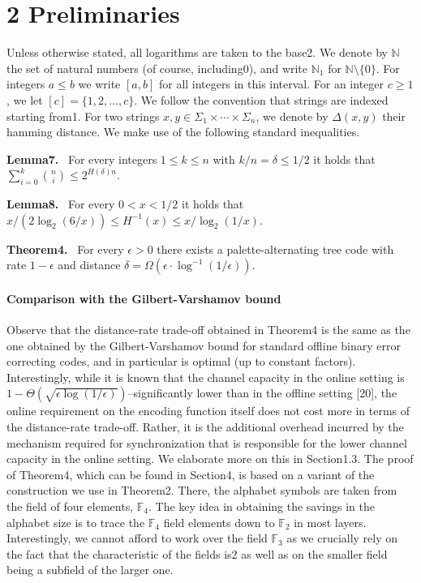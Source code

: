 \documentclass[10pt,a4paper]{article}
\newenvironment{authorclaim}[1]{\par\medskip\noindent\textbf{#1.}\ \ignorespaces}{\par\medskip}
\begin{document}
\section*{2 Preliminaries}
Unless otherwise stated, all logarithms are taken to the base2. We denote by $\mathbb N$ the set of natural numbers (of course, including0), and write $\mathbb N_1$ for $\mathbb N\setminus\{0\}$. For integers $a\le b$ we write $[a,b]$ for all integers in this interval. For an integer $c\ge1$, we let $[c]=\{1,2,\ldots,c\}$. We follow the convention that strings are indexed starting from1. For two strings $x,y\in\Sigma_1\times\cdots\times\Sigma_n$, we denote by $\Delta(x,y)$ their hamming distance. We make use of the following standard inequalities.
\begin{authorclaim}{Lemma7}
For every integers $1\le k\le n$ with $k/n=\delta\le1/2$ it holds that $\sum_{i=0}^k\binom ni\le2^{H(\delta)n}$.
\end{authorclaim}
\begin{authorclaim}{Lemma8}
For every $0<x<1/2$ it holds that $x/(2\log_2(6/x))\le H^{-1}(x)\le x/\log_2(1/x)$.
\end{authorclaim}

\begin{authorclaim}{Theorem4}
For every $\epsilon>0$ there exists a palette-alternating tree code with rate $1-\epsilon$ and distance $\delta=\Omega(\epsilon\cdot\log^{-1}(1/\epsilon))$.
\end{authorclaim}
\paragraph{Comparison with the Gilbert-Varshamov bound}
Observe that the distance-rate trade-off obtained in Theorem4 is the same as the one obtained by the Gilbert-Varshamov bound for standard offline binary error correcting codes, and in particular is optimal (up to constant factors). Interestingly, while it is known that the channel capacity in the online setting is $1-\Theta(\sqrt{\epsilon\log(1/\epsilon)})$--significantly lower than in the offline setting [20], the online requirement on the encoding function itself does not cost more in terms of the distance-rate trade-off. Rather, it is the additional overhead incurred by the mechanism required for synchronization that is responsible for the lower channel capacity in the online setting. We elaborate more on this in Section1.3.
The proof of Theorem4, which can be found in Section4, is based on a variant of the construction we use in Theorem2. There, the alphabet symbols are taken from the field of four elements, $\mathbb F_4$. The key idea in obtaining the savings in the alphabet size is to trace the $\mathbb F_4$ field elements down to $\mathbb F_2$ in most layers. Interestingly, we cannot afford to work over the field $\mathbb F_3$ as we crucially rely on the fact that the characteristic of the fields is2 as well as on the smaller field being a subfield of the larger one.
\end{document}
